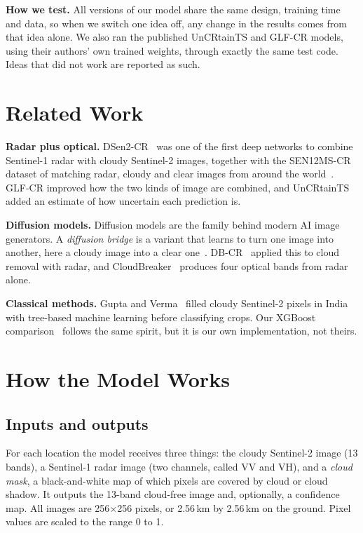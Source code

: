 \documentclass[conference]{IEEEtran}
\begin{document}
\textbf{How we test.} All versions of our model share the same design, training time and data, so
when we switch one idea off, any change in the results comes from that idea alone. We also ran the
published UnCRtainTS and GLF-CR models, using their authors' own trained weights, through exactly
the same test code. Ideas that did not work are reported as such.

\section{Related Work}
\textbf{Radar plus optical.} DSen2-CR~\cite{meraner2020dsen2cr} was one of the first deep networks
to combine Sentinel-1 radar with cloudy Sentinel-2 images, together with the SEN12MS-CR dataset of
matching radar, cloudy and clear images from around the world~\cite{ebel2021sen12mscr}. GLF-CR
\cite{xu2022glfcr} improved how the two kinds of image are combined, and UnCRtainTS
\cite{ebel2023uncrtaints} added an estimate of how uncertain each prediction is.

\textbf{Diffusion models.} Diffusion models are the family behind modern AI image generators. A
\emph{diffusion bridge} is a variant that learns to turn one image into another, here a cloudy
image into a clear one~\cite{li2023bbdm}. DB-CR~\cite{hu2025dbcr} applied this to cloud removal
with radar, and CloudBreaker~\cite{ahmed2025cloudbreaker} produces four optical bands from radar
alone.

\textbf{Classical methods.} Gupta and Verma~\cite{gupta2026cloudfree} filled cloudy Sentinel-2
pixels in India with tree-based machine learning before classifying crops. Our XGBoost
comparison~\cite{chen2016xgboost} follows the same spirit, but it is our own implementation,
not theirs.

\section{How the Model Works}

\subsection{Inputs and outputs}
For each location the model receives three things: the cloudy Sentinel-2 image (13 bands), a
Sentinel-1 radar image (two channels, called VV and VH), and a \emph{cloud mask}, a black-and-white
map of which pixels are covered by cloud or cloud shadow. It outputs the 13-band cloud-free image
and, optionally, a confidence map. All images are 256$\times$256 pixels, or 2.56\,km by 2.56\,km
on the ground. Pixel values are scaled to the range 0 to 1.
\end{document}
